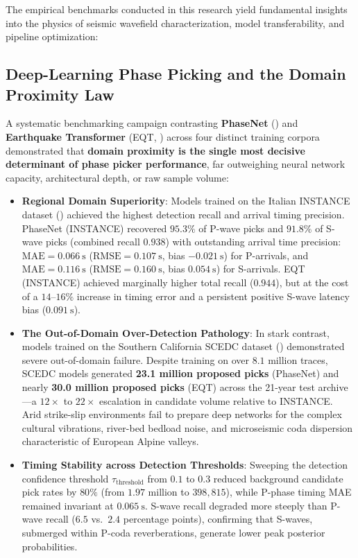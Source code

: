 The empirical benchmarks conducted in this research yield
fundamental insights into the physics of seismic wavefield
characterization, model transferability, and pipeline optimization:

\subsection{Deep-Learning Phase Picking and the Domain Proximity Law}
A systematic benchmarking campaign contrasting \textbf{PhaseNet}
(\cite{PhaseNet}) and \textbf{Earthquake Transformer}
(\ac{EQT}, \cite{EQTransformer}) across four distinct
training corpora demonstrated that \textbf{domain proximity is the
single most decisive determinant of phase picker performance}, far
outweighing neural network capacity, architectural depth, or raw sample volume:
\begin{itemize}
  \item \textbf{Regional Domain Superiority}: Models trained on the
    Italian \acf{INSTANCE} dataset (\cite{INSTANCE}) achieved the
    highest detection recall and arrival timing precision. PhaseNet
    (INSTANCE) recovered $95.3\%$ of P-wave picks and $91.8\%$ of
    S-wave picks (combined recall $0.938$) with outstanding arrival
    time precision: $\mathrm{MAE} = \qty{0.066}{\second}$
    ($\mathrm{RMSE} = \qty{0.107}{\second}$, bias
    $\qty{-0.021}{\second}$) for P-arrivals, and $\mathrm{MAE} =
    \qty{0.116}{\second}$ ($\mathrm{RMSE} = \qty{0.160}{\second}$,
    bias $\qty{+0.054}{\second}$) for S-arrivals. \ac{EQT}
    (\ac{INSTANCE}) achieved marginally higher total recall ($0.944$),
    but at the cost of a $14\text{--}16\%$ increase in timing error
    and a persistent positive S-wave latency bias ($\qty{+0.091}{\second}$).
  \item \textbf{The Out-of-Domain Over-Detection Pathology}: In
    stark contrast, models trained on the Southern California
    \ac{SCEDC} dataset (\cite{SCEDC}) demonstrated severe
    out-of-domain failure. Despite training on over $8.1$ million
    traces, \ac{SCEDC} models generated \textbf{23.1 million proposed
    picks} (\ac{PhaseNet}) and nearly \textbf{30.0 million proposed
    picks} (\ac{EQT}) across the 21-year test archive---a
    $12 \times $ to $22 \times $ escalation in candidate volume relative
    to \ac{INSTANCE}. Arid strike-slip environments fail to prepare deep
    networks for the complex cultural vibrations, river-bed bedload
    noise, and microseismic coda dispersion characteristic of
    European Alpine valleys.
  \item \textbf{Timing Stability across Detection Thresholds}:
    Sweeping the detection confidence threshold
    $\tau_{\mathrm{threshold}}$ from $0.1$ to $0.3$ reduced
    background candidate pick rates by $80\%$ (from $1.97$ million
    to $398{,}815$), while P-phase timing MAE remained invariant at
    $\qty{0.065}{\second}$. S-wave recall degraded more steeply
    than P-wave recall ($6.5$ vs.\ $2.4$ percentage points),
    confirming that S-waves, submerged within P-coda reverberations,
    generate lower peak posterior probabilities.
\end{itemize}

